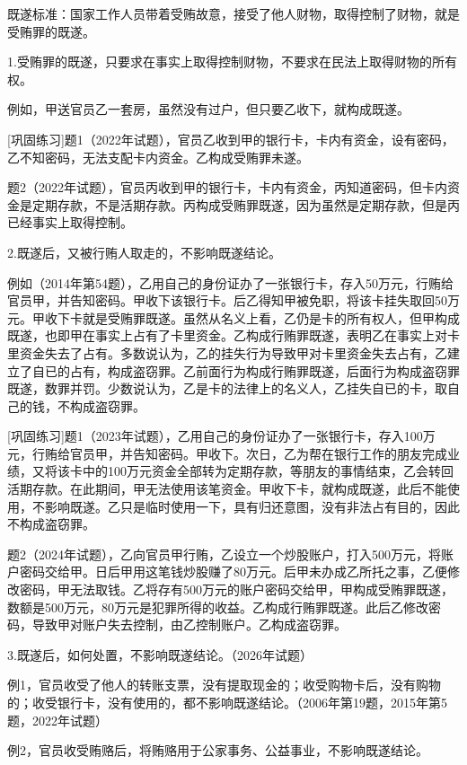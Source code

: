既遂标准：国家工作人员带着受贿故意，接受了他人财物，取得控制了财物，就是受贿罪的既遂。

1.受贿罪的既遂，只要求在事实上取得控制财物，不要求在民法上取得财物的所有权。

例如，甲送官员乙一套房，虽然没有过户，但只要乙收下，就构成既遂。

[巩固练习]题1（2022年试题），官员乙收到甲的银行卡，卡内有资金，设有密码，乙不知密码，无法支配卡内资金。乙构成受贿罪未遂。

题2（2022年试题），官员丙收到甲的银行卡，卡内有资金，丙知道密码，但卡内资金是定期存款，不是活期存款。丙构成受贿罪既遂，因为虽然是定期存款，但是丙已经事实上取得控制。

2.既遂后，又被行贿人取走的，不影响既遂结论。

例如（2014年第54题），乙用自己的身份证办了一张银行卡，存入50万元，行贿给官员甲，并告知密码。甲收下该银行卡。后乙得知甲被免职，将该卡挂失取回50万元。甲收下卡就是受贿罪既遂。虽然从名义上看，乙仍是卡的所有权人，但甲构成既遂，也即甲在事实上占有了卡里资金。乙构成行贿罪既遂，表明乙在事实上对卡里资金失去了占有。多数说认为，乙的挂失行为导致甲对卡里资金失去占有，乙建立了自已的占有，构成盗窃罪。乙前面行为构成行贿罪既遂，后面行为构成盗窃罪既遂，数罪并罚。少数说认为，乙是卡的法律上的名义人，乙挂失自已的卡，取自己的钱，不构成盗窃罪。

[巩固练习]题1（2023年试题），乙用自己的身份证办了一张银行卡，存入100万元，行贿给官员甲，并告知密码。甲收下。次日，乙为帮在银行工作的朋友完成业绩，又将该卡中的100万元资金全部转为定期存款，等朋友的事情结束，乙会转回活期存款。在此期间，甲无法使用该笔资金。甲收下卡，就构成既遂，此后不能使用，不影响既遂。乙只是临时使用一下，具有归还意图，没有非法占有目的，因此不构成盗窃罪。

题2（2024年试题），乙向官员甲行贿，乙设立一个炒股账户，打入500万元，将账户密码交给甲。日后甲用这笔钱炒股赚了80万元。后甲未办成乙所托之事，乙便修改密码，甲无法取钱。乙将存有500万元的账户密码交给甲，甲构成受贿罪既遂，数额是500万元，80万元是犯罪所得的收益。乙构成行贿罪既遂。此后乙修改密码，导致甲对账户失去控制，由乙控制账户。乙构成盗窃罪。

3.既遂后，如何处置，不影响既遂结论。（2026年试题）

例1，官员收受了他人的转账支票，没有提取现金的；收受购物卡后，没有购物的；收受银行卡，没有使用的，都不影响既遂结论。（2006年第19题，2015年第5题，2022年试题）

例2，官员收受贿赂后，将贿赂用于公家事务、公益事业，不影响既遂结论。

